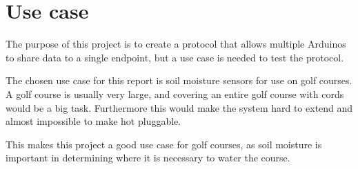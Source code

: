 \chapter{Use case}
The purpose of this project is to create a protocol that allows multiple Arduinos to share data to a single endpoint, but a use case is needed to test the protocol.

The chosen use case for this report is soil moisture sensors for use on golf courses. A golf course is usually very large, and covering an entire golf course with cords would be a big task. Furthermore this would make the system hard to extend and almost impossible to make hot pluggable.

This makes this project a good use case for golf courses, as soil moisture is important in determining where it is necessary to water the course.

